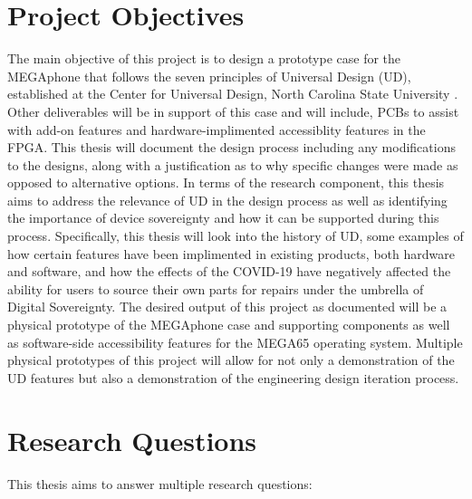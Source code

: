 

\section{Project Objectives}

The main objective of this project is to design a prototype case for the MEGAphone that follows the seven principles of Universal Design (UD), established at the Center for Universal Design, North Carolina State University \cite{sevenprinciples}. 
Other deliverables will be in support of this case and will include, PCBs to assist with add-on features and hardware-implimented accessiblity features in the FPGA.
This thesis will document the design process including any modifications to the designs, along with a justification as to why specific changes were made as opposed to alternative options.
In terms of the research component, this thesis aims to address the relevance of UD in the design process as well as identifying the importance of device sovereignty and how it can be supported during this process.
Specifically, this thesis will look into the history of UD, some examples of how certain features have been implimented in existing products, both hardware and software, and how the effects of the COVID-19 have negatively affected the ability for users to source their own parts for repairs under the umbrella of Digital Sovereignty.
The desired output of this project as documented will be a physical prototype of the MEGAphone case and supporting components as well as software-side accessibility features for the MEGA65 operating system.
Multiple physical prototypes of this project will allow for not only a demonstration of the UD features but also a demonstration of the engineering design iteration process.
 

\section{Research Questions}

This thesis aims to answer multiple research questions:

